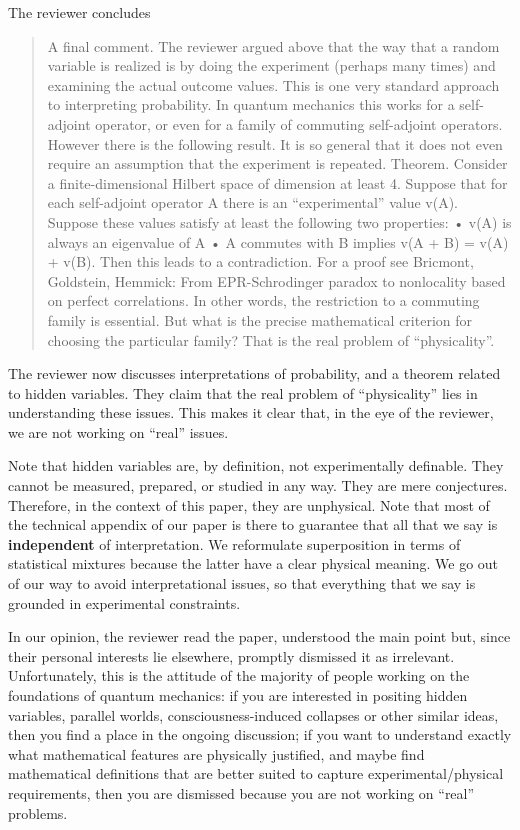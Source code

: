\documentclass[11pt, executivepaper]{article}
\begin{document}
The reviewer concludes
\begin{quote}
A final comment. The reviewer argued above that the way that a random
variable is realized is by doing the experiment (perhaps many times) and examining
the actual outcome values. This is one very standard approach to
interpreting probability.
In quantum mechanics this works for a self-adjoint operator, or even for
a family of commuting self-adjoint operators. However there is the following
result. It is so general that it does not even require an assumption that the
experiment is repeated.
Theorem. Consider a finite-dimensional Hilbert space of dimension at least
4. Suppose that for each self-adjoint operator A there is an “experimental”
value v(A). Suppose these values satisfy at least the following two properties:
• v(A) is always an eigenvalue of A
• A commutes with B implies v(A + B) = v(A) + v(B).
Then this leads to a contradiction. For a proof see Bricmont, Goldstein,
Hemmick: From EPR-Schrodinger paradox to nonlocality based on perfect correlations.
In other words, the restriction to a commuting family is essential. But what
is the precise mathematical criterion for choosing the particular family? That
is the real problem of “physicality”.
\end{quote}
The reviewer now discusses interpretations of probability, and a theorem related to hidden variables. They claim that the real problem of ``physicality'' lies in understanding these issues. This makes it clear that, in the eye of the reviewer, we are not working on ``real'' issues.

Note that hidden variables are, by definition, not experimentally definable. They cannot be measured, prepared, or studied in any way. They are mere conjectures. Therefore, in the context of this paper, they are unphysical. Note that most of the technical appendix of our paper is there to guarantee that all that we say is \textbf{independent} of interpretation. We reformulate superposition in terms of statistical mixtures because the latter have a clear physical meaning. We go out of our way to avoid interpretational issues, so that everything that we say is grounded in experimental constraints.

In our opinion, the reviewer read the paper, understood the main point but, since their personal interests lie elsewhere, promptly dismissed it as irrelevant. Unfortunately, this is the attitude of the majority of people working on the foundations of quantum mechanics: if you are interested in positing hidden variables, parallel worlds, consciousness-induced collapses or other similar ideas, then you find a place in the ongoing discussion; if you want to understand exactly what mathematical features are physically justified, and maybe find mathematical definitions that are better suited to capture experimental/physical requirements, then you are dismissed because you are not working on ``real'' problems. 



%
%
\end{document}
